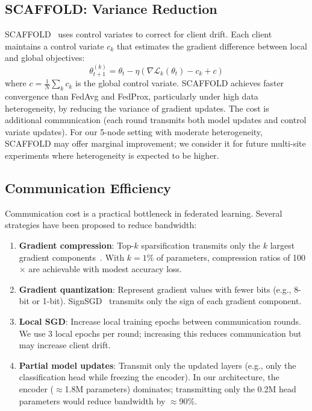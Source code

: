\subsection{SCAFFOLD: Variance Reduction}

SCAFFOLD~\cite{karimireddy2020scaffold} uses control variates to correct for client drift. Each client maintains a control variate $c_k$ that estimates the gradient difference between local and global objectives:
\begin{equation}
\theta_{t+1}^{(k)} = \theta_t - \eta (\nabla \mathcal{L}_k(\theta_t) - c_k + c)
\end{equation}
where $c = \frac{1}{N}\sum_k c_k$ is the global control variate. SCAFFOLD achieves faster convergence than FedAvg and FedProx, particularly under high data heterogeneity, by reducing the variance of gradient updates. The cost is additional communication (each round transmits both model updates and control variate updates). For our 5-node setting with moderate heterogeneity, SCAFFOLD may offer marginal improvement; we consider it for future multi-site experiments where heterogeneity is expected to be higher.

\subsection{Communication Efficiency}

Communication cost is a practical bottleneck in federated learning. Several strategies have been proposed to reduce bandwidth:

\begin{enumerate}
\item \textbf{Gradient compression}: Top-$k$ sparsification transmits only the $k$ largest gradient components~\cite{alistarh2017qsgd}. With $k = 1\%$ of parameters, compression ratios of 100$\times$ are achievable with modest accuracy loss.
\item \textbf{Gradient quantization}: Represent gradient values with fewer bits (e.g., 8-bit or 1-bit). SignSGD~\cite{bernstein2018signsgd} transmits only the sign of each gradient component.
\item \textbf{Local SGD}: Increase local training epochs between communication rounds. We use 3 local epochs per round; increasing this reduces communication but may increase client drift.
\item \textbf{Partial model updates}: Transmit only the updated layers (e.g., only the classification head while freezing the encoder). In our architecture, the encoder ($\approx$1.8M parameters) dominates; transmitting only the 0.2M head parameters would reduce bandwidth by $\approx$90\%.
\end{enumerate}

